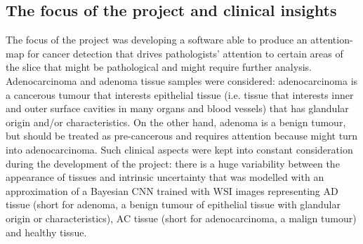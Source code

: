 \documentclass[12pt]{article}
\begin{document}
\subsection{The focus of the project and clinical insights}
The focus of the project was developing a software able to produce an attention-map for cancer detection that drives pathologists’ attention to certain areas of the slice that might be pathological and might require further analysis.\\
Adenocarcinoma and adenoma tissue samples were considered: adenocarcinoma is a cancerous tumour that interests epithelial tissue (i.e. tissue that interests inner and outer surface cavities in many organs and blood vessels) that has glandular origin and/or characteristics. On the other hand, adenoma is a benign tumour, but should be treated as pre-cancerous and requires attention because might turn into adenocarcinoma.
Such clinical aspects were kept into constant consideration during the development of the project: there is a huge variability between the appearance of tissues and intrinsic uncertainty that was modelled with an approximation of a Bayesian CNN trained with WSI images representing AD tissue (short for adenoma, a benign tumour of epithelial tissue with glandular origin or characteristics), AC tissue (short for adenocarcinoma, a malign tumour) and healthy tissue. 
\\
\end{document}
